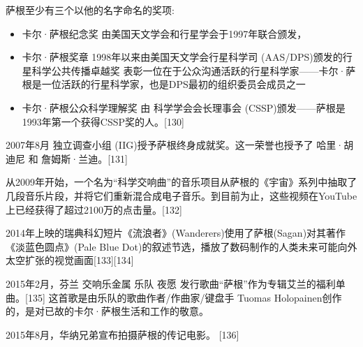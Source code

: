 萨根至少有三个以他的名字命名的奖项:
\begin{itemize}
\item 卡尔·萨根纪念奖 由美国天文学会和行星学会于1997年联合颁发，
\item 卡尔·萨根奖章 1998年以来由美国天文学会行星科学司 (AAS/DPS)颁发的行星科学公共传播卓越奖 表彰一位在于公众沟通活跃的行星科学家——卡尔·萨根是一位活跃的行星科学家，也是DPS最初的组织委员会成员之一
\item 卡尔·萨根公众科学理解奖 由 科学学会会长理事会 (CSSP)颁发——萨根是1993年第一个获得CSSP奖的人。[130]
\end{itemize}
2007年8月 独立调查小组 (IIG)授予萨根终身成就奖。这一荣誉也授予了 哈里·胡迪尼 和 詹姆斯·兰迪。[131]

从2009年开始，一个名为“科学交响曲”的音乐项目从萨根的《宇宙》系列中抽取了几段音乐片段，并将它们重新混合成电子音乐。到目前为止，这些视频在YouTube上已经获得了超过2100万的点击量。[132]

2014年上映的瑞典科幻短片《流浪者》(Wanderers)使用了萨根(Sagan)对其著作《淡蓝色圆点》(Pale Blue Dot)的叙述节选，播放了数码制作的人类未来可能向外太空扩张的视觉画面[133][134]

2015年2月，芬兰 交响乐金属 乐队 夜愿 发行歌曲“萨根”作为专辑艾兰的福利单曲。[135] 这首歌是由乐队的歌曲作者/作曲家/键盘手 Tuomas Holopainen创作的，是对已故的卡尔·萨根生活和工作的敬意。

2015年8月，华纳兄弟宣布拍摄萨根的传记电影。 [136]

